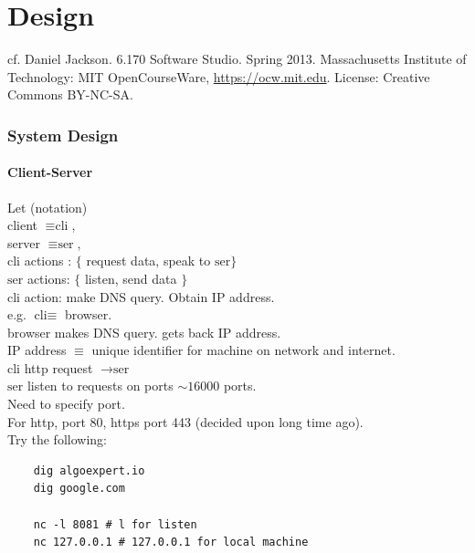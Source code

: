 \documentclass[10pt]{amsart}
\begin{document}
\part{Design}


cf. Daniel Jackson. 6.170 Software Studio. Spring 2013. Massachusetts Institute of Technology: MIT OpenCourseWare, \url{https://ocw.mit.edu}. License: Creative Commons BY-NC-SA.

\section{System Design}

\subsection{Client-Server}

Let (notation) \\
client $\equiv \text{cli}$, \\
server $\equiv \text{ser}$, \\

$\text{cli}$ actions : $\lbrace $ request data, speak to $\text{ser} \rbrace$  \\
$\text{ser}$ actions: $\lbrace$ listen, send data $\rbrace$ \\

$\text{cli}$ action: make DNS query. Obtain IP address. \\

e.g. $\text{cli} \equiv $ browser. \\
browser makes DNS query. gets back IP address. \\
IP address $\equiv $ unique identifier for machine on network and internet. \\

$\text{cli}$ http request $\to  \text{ser}$ \\

$\text{ser}$ listen to requests on ports $\sim 16000$ ports. \\
Need to specify port. \\
For http, port 80, https port 443 (decided upon long time ago). \\

Try the following:

\begin{lstlisting}
	dig algoexpert.io
	dig google.com
	
	nc -l 8081 # l for listen
	nc 127.0.0.1 # 127.0.0.1 for local machine
\end{lstlisting}
\end{document}
